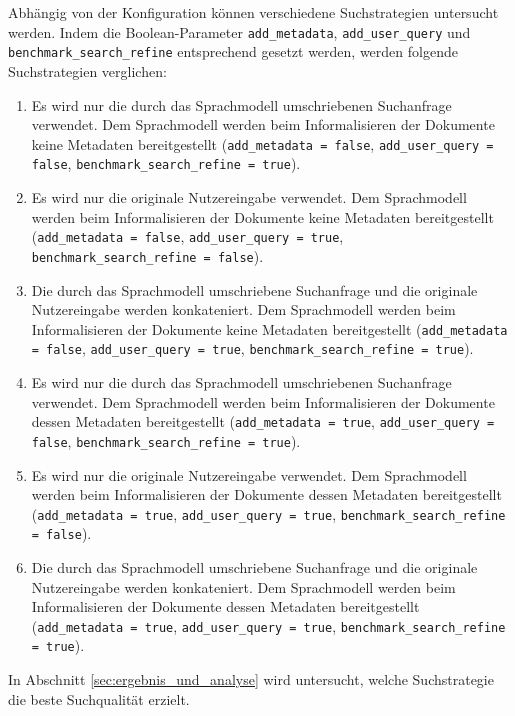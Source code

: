 \documentclass[12pt,letterpaper]{article} %
\begin{document}
Abhängig von der Konfiguration können verschiedene Suchstrategien untersucht werden.
Indem die Boolean-Parameter \texttt{add\_metadata}, \texttt{add\_user\_query} und \texttt{benchmark\_search\_refine} entsprechend gesetzt werden, werden folgende Suchstrategien verglichen:
\begin{enumerate}
  \item Es wird nur die durch das Sprachmodell umschriebenen Suchanfrage verwendet. Dem Sprachmodell werden beim Informalisieren der Dokumente keine Metadaten bereitgestellt (\texttt{add\_metadata = false}, \texttt{add\_user\_query = false}, \texttt{benchmark\_search\_refine = true}).

  \item Es wird nur die originale Nutzereingabe verwendet. Dem Sprachmodell werden beim Informalisieren der Dokumente keine Metadaten bereitgestellt (\texttt{add\_metadata = false}, \texttt{add\_user\_query = true}, \texttt{benchmark\_search\_refine = false}).

  \item Die durch das Sprachmodell umschriebene Suchanfrage und die originale Nutzereingabe werden konkateniert. Dem Sprachmodell werden beim Informalisieren der Dokumente keine Metadaten bereitgestellt (\texttt{add\_metadata = false}, \texttt{add\_user\_query = true}, \texttt{benchmark\_search\_refine = true}).

  \item Es wird nur die durch das Sprachmodell umschriebenen Suchanfrage verwendet. Dem Sprachmodell werden beim Informalisieren der Dokumente dessen Metadaten bereitgestellt (\texttt{add\_metadata = true}, \texttt{add\_user\_query = false}, \texttt{benchmark\_search\_refine = true}).

  \item Es wird nur die originale Nutzereingabe verwendet. Dem Sprachmodell werden beim Informalisieren der Dokumente dessen Metadaten bereitgestellt (\texttt{add\_metadata = true}, \texttt{add\_user\_query = true}, \texttt{benchmark\_search\_refine = false}).

  \item Die durch das Sprachmodell umschriebene Suchanfrage und die originale Nutzereingabe werden konkateniert. Dem Sprachmodell werden beim Informalisieren der Dokumente dessen Metadaten bereitgestellt (\texttt{add\_metadata = true}, \texttt{add\_user\_query = true}, \texttt{benchmark\_search\_refine = true}).
\end{enumerate}
In Abschnitt \ref{sec:ergebnis_und_analyse} wird untersucht, welche Suchstrategie die beste Suchqualität erzielt.
\end{document}
